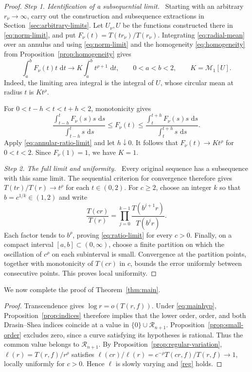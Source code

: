 \documentclass[11pt,letterpaper,reqno]{amsart}
\theoremstyle{remark}
\numberwithin{equation}{section}
\newcommand{\dd}{\,\mathrm d}
\newcommand{\mean}[2]{\mathcal M_{#1}\!\left[#2\right]}
\newcommand{\Gn}{\mathcal R_{n+1}}
\newcommand{\step}[1]{\medskip\noindent\emph{#1}\ }
\begin{document}
\begin{proof}
\step{Step 1. Identification of a subsequential limit.}
Starting with an arbitrary $r_\nu\to\infty$, carry out the
construction and subsequence extractions in
Section~\ref{sec:arbitrary-limits}. Let $U_\nu,U$ be the functions
constructed there in \eqref{eq:norm-limit}, and put
$F_\nu(t)=T(tr_\nu)/T(r_\nu)$.
Integrating \eqref{eq:radial-mean} over an annulus and using
\eqref{eq:norm-limit} and the homogeneity \eqref{eq:homogeneity} from
Proposition~\ref{prop:homogeneity} gives
\begin{equation}\label{eq:annular-ratio-limit}
 \int_a^bF_\nu(t)t\,\dd t\longrightarrow
 K\int_a^bt^{\rho+1}\,\dd t,
 \qquad 0<a<b<2,\qquad K=\mean1U.
\end{equation}
Indeed, the limiting area integral is the integral of $U$, whose
circular mean at radius $t$ is $Kt^\rho$.

For $0<t-h<t<t+h<2$, monotonicity gives
\[
 \frac{\int_{t-h}^tF_\nu(s)s\,\dd s}{\int_{t-h}^ts\,\dd s}
 \leq F_\nu(t)\leq
 \frac{\int_t^{t+h}F_\nu(s)s\,\dd s}{\int_t^{t+h}s\,\dd s}.
\]
Apply \eqref{eq:annular-ratio-limit} and let $h\downarrow0$.
It follows that $F_\nu(t)\to Kt^\rho$ for $0<t<2$.
Since $F_\nu(1)=1$, we have $K=1$.

\step{Step 2. The full limit and uniformity.}
Every original sequence has a subsequence with this same limit.
The sequential criterion for convergence therefore gives
$T(tr)/T(r)\to t^\rho$ for each $t\in(0,2)$.
For $c\geq2$, choose an integer $k$ so that $b=c^{1/k}\in(1,2)$ and write
\[
 \frac{T(cr)}{T(r)}=
 \prod_{j=0}^{k-1}\frac{T(b^{j+1}r)}{T(b^jr)}.
\]
Each factor tends to $b^\rho$, proving \eqref{eq:ratio-limit} for every
$c>0$. Finally, on a compact interval $[a,b]\subset(0,\infty)$,
choose a finite partition on which the oscillation of $c^\rho$ on
each subinterval is small. Convergence at the partition points,
together with monotonicity of $T(cr)$ in $c$, bounds the error uniformly
between consecutive points. This proves local uniformity.
\end{proof}

We now complete the proof of Theorem~\ref{thm:main}.

\begin{proof}
Transcendence gives $\log r=o(T(r,f))$. Under \eqref{eq:mainhyp},
Proposition~\ref{prop:indices}
therefore implies that the lower order, order, and both Drasin--Shea
indices coincide at a value in $\{0\}\cup\Gn$.
Proposition~\ref{prop:small-order} excludes zero, since a curve satisfying
its hypotheses is rational. Thus the common value belongs to $\Gn$.
By Proposition~\ref{prop:regular-variation},
$\ell(r)=T(r,f)/r^\rho$ satisfies
$\ell(cr)/\ell(r)=c^{-\rho}T(cr,f)/T(r,f)\to1$, locally uniformly for
$c>0$. Hence $\ell$ is slowly varying and \eqref{reg} holds.
\end{proof}
\end{document}
